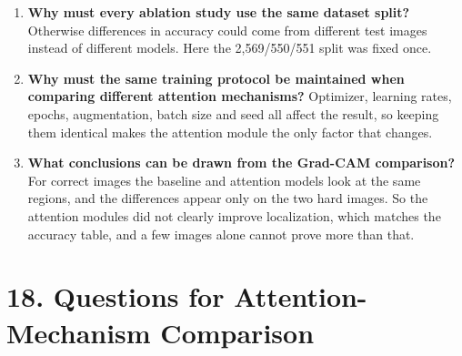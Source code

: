 \documentclass[10pt]{article}
\begin{document}
\begin{enumerate}
\item \textbf{Why must every ablation study use the same dataset split?}
Otherwise differences in accuracy could come from different test images
instead of different models. Here the 2{,}569/550/551 split was fixed once.

\item \textbf{Why must the same training protocol be maintained when comparing different attention mechanisms?}
Optimizer, learning rates, epochs, augmentation, batch size and seed all
affect the result, so keeping them identical makes the attention module the
only factor that changes.

\item \textbf{What conclusions can be drawn from the Grad-CAM comparison?}
For correct images the baseline and attention models look at the same
regions, and the differences appear only on the two hard images. So the
attention modules did not clearly improve localization, which matches the
accuracy table, and a few images alone cannot prove more than that.
\end{enumerate}

\section*{18. Questions for Attention-Mechanism Comparison}
\end{document}
